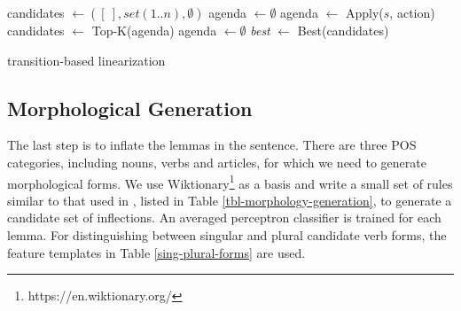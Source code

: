 \documentclass[11pt]{article}
\begin{document}
\begin{algorithm}[t]
\small
\DontPrintSemicolon {}
candidates $\gets ([\ ], set(1..n), \emptyset)$ \;
agenda $\gets \emptyset$ \;
 {
   {
     {
      agenda $\gets$ {\sc Apply}($s$, action)\;
    }
  }
  candidates $\gets$ {\sc Top-K}(agenda) \;
  agenda $\gets \emptyset$ \;
}
{\it best} $\gets$ {\sc Best}(candidates) \;
\;
\caption{transition-based linearization}
\label{algo:beam-search}
\end{algorithm}  
  
\subsection{Morphological Generation}
\label{morphological-generation}
The last step is to inflate the lemmas in the sentence. There are three POS categories, including nouns, verbs and articles, for which we need to generate morphological forms. We use Wiktionary\footnote{https://en.wiktionary.org/} as a basis and write a small set of rules similar to that used in , listed in Table \ref{tbl-morphology-generation}, to generate a candidate set of inflections. An averaged perceptron classifier \cite{W02-1001} is trained for each lemma. For distinguishing between singular and plural candidate verb forms, the feature templates in Table \ref{sing-plural-forms} are used.
\end{document}
